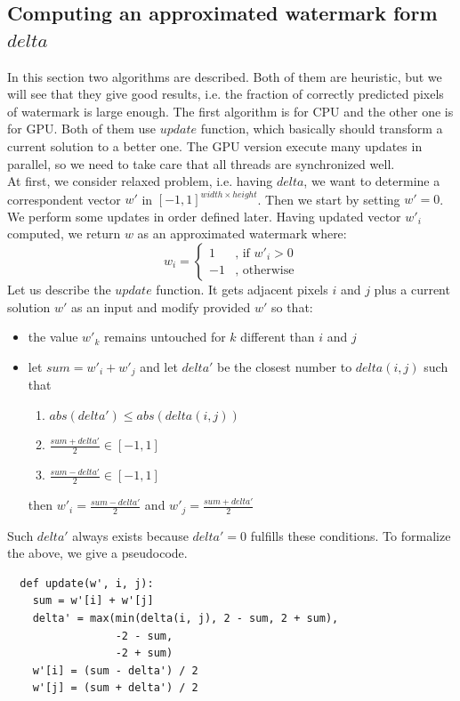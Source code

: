 \documentclass[a4paper,12pt]{article}
\begin{document}
\subsection{Computing an approximated watermark form $delta$}

In this section two algorithms are described. Both of them are heuristic,
but we will see that they give good results, i.e. the fraction of correctly
predicted pixels of watermark is large enough. The first algorithm is for
CPU and the other one is for GPU. Both of them use $update$
function, which basically should transform a current solution to
a better one. The GPU version execute many updates in parallel, so we need
to take care that all threads are synchronized well.\\
At first, we consider relaxed problem, i.e. having $delta$, we want to determine
a correspondent vector $w'$ in $[-1, 1]^{width\times height}$. Then we start by
setting $w' = 0$. We perform some updates in order defined later.
Having updated vector $w'_i$ computed, we return $w$ as an approximated watermark 
where:
$$w_i = \left\{
\begin{matrix}
1 & \text{, if } w'_i > 0\\
-1 & \text{, otherwise}
\end{matrix}\right.$$
Let us describe the $update$ function. It gets adjacent pixels $i$ and $j$ 
plus a current solution $w'$ as an input and modify provided $w'$ so that:
\begin{itemize}
  \item the value $w'_k$ remains untouched for $k$ different than $i$ and $j$
  \item let $sum = w'_i + w'_j$ and let $delta'$ be the closest number to $delta(i,j)$ such that
    \begin{enumerate}
      \item $abs(delta') \leq abs(delta(i,j))$
      \item $\frac{sum + delta'}{2} \in [-1,1]$
      \item $\frac{sum - delta'}{2} \in [-1,1]$
    \end{enumerate}
    then $w'_i = \frac{sum - delta'}{2}$ and $w'_j = \frac{sum + delta'}{2}$
\end{itemize}
Such $delta'$ always exists because $delta' = 0$ fulfills these conditions.
To formalize the above, we give a pseudocode.
\begin{lstlisting}
  def update(w', i, j):
    sum = w'[i] + w'[j]
    delta' = max(min(delta(i, j), 2 - sum, 2 + sum),
                 -2 - sum,
                 -2 + sum)
    w'[i] = (sum - delta') / 2
    w'[j] = (sum + delta') / 2
\end{lstlisting}
\end{document}
